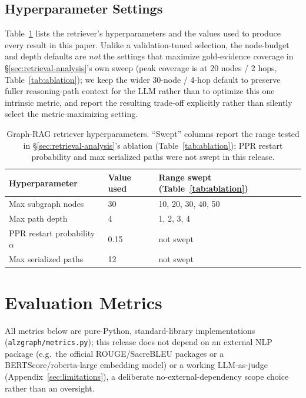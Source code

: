\documentclass{article}
\begin{document}
\subsection{Hyperparameter Settings}
\label{app:retriever-hyperparams}
Table~\ref{tab:retriever-hparams} lists the retriever's hyperparameters and the values used to produce every result in this paper. Unlike a validation-tuned selection, the node-budget and depth defaults are \emph{not} the settings that maximize gold-evidence coverage in \S\ref{sec:retrieval-analysis}'s own sweep (peak coverage is at 20 nodes / 2 hops, Table~\ref{tab:ablation}); we keep the wider 30-node / 4-hop default to preserve fuller reasoning-path context for the LLM rather than to optimize this one intrinsic metric, and report the resulting trade-off explicitly rather than silently select the metric-maximizing setting.

\begin{table}[h]
\centering
\caption{Graph-RAG retriever hyperparameters. ``Swept'' columns report the range tested in \S\ref{sec:retrieval-analysis}'s ablation (Table~\ref{tab:ablation}); PPR restart probability and max serialized paths were not swept in this release.}
\label{tab:retriever-hparams}
\small
\begin{tabular}{lll}
\toprule
\textbf{Hyperparameter} & \textbf{Value used} & \textbf{Range swept (Table~\ref{tab:ablation})} \\
\midrule
Max subgraph nodes & 30 & 10, 20, 30, 40, 50 \\
Max path depth & 4 & 1, 2, 3, 4 \\
PPR restart probability $\alpha$ & 0.15 & not swept \\
Max serialized paths & 12 & not swept \\
\bottomrule
\end{tabular}
\end{table}

\newpage
\section{Evaluation Metrics}
\label{app:metrics}
All metrics below are pure-Python, standard-library implementations (\texttt{alzgraph/metrics.py}); this release does not depend on an external NLP package (e.g.\ the official ROUGE/SacreBLEU packages or a BERTScore/roberta-large embedding model) or a working LLM-as-judge (Appendix~\ref{sec:limitations}), a deliberate no-external-dependency scope choice rather than an oversight.
\end{document}
